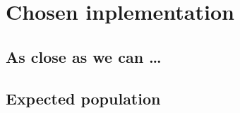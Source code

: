 \section{Chosen inplementation}

\subsection{As close as we can \dots}

\subsection{Expected population}
